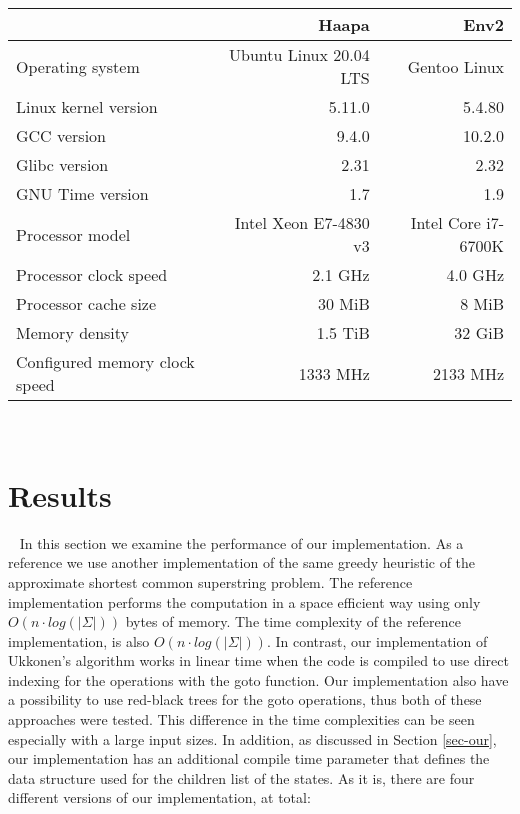 \documentclass[english,twoside,censored,csm,algorithms-track-2020]{HYthesisML}
\theoremstyle{plain}
\theoremstyle{definition}
\begin{document}
\begin{tabular}{l|r|r}
  & \textbf{Haapa} & \textbf{Env2} \\
  \hline
  Operating system & Ubuntu Linux 20.04 LTS & Gentoo Linux \\
  Linux kernel version & 5.11.0 & 5.4.80 \\
  GCC version & 9.4.0 & 10.2.0 \\
  Glibc version & 2.31 & 2.32 \\
  GNU Time version & 1.7 & 1.9 \\
  \hline
  Processor model & Intel Xeon E7-4830 v3 & Intel Core i7-6700K \\
  Processor clock speed & 2.1 GHz & 4.0 GHz \\
  Processor cache size & 30 MiB & 8 MiB \\
  Memory density & 1.5 TiB & 32 GiB \\
  Configured memory clock speed & 1333 MHz & 2133 MHz \\
\end{tabular}
\\








\section{Results}~\label{sec-results}
In this section we examine the performance of our implementation. As a reference we use another
implementation of the same greedy heuristic of the approximate shortest common superstring problem.
The reference implementation \citep{Alanko19} performs the computation in a space efficient way using
only $O(n \cdot log(|\Sigma|))$ bytes of memory. The time complexity of the reference implementation,
is also $O(n \cdot log(|\Sigma|))$. In contrast, our implementation of Ukkonen's algorithm
works in linear time when the code is compiled to use direct indexing for the operations with
the goto function. Our implementation also have a possibility to use red-black trees for the goto
operations, thus both of these approaches were tested.
This difference in the time complexities can be seen especially with a large input sizes.
In addition, as discussed in Section
\ref{sec-our}, our implementation has an additional compile time parameter that defines the data
structure used for the children list of the states. As it is, there are four different versions of
our implementation, at total:
\end{document}
